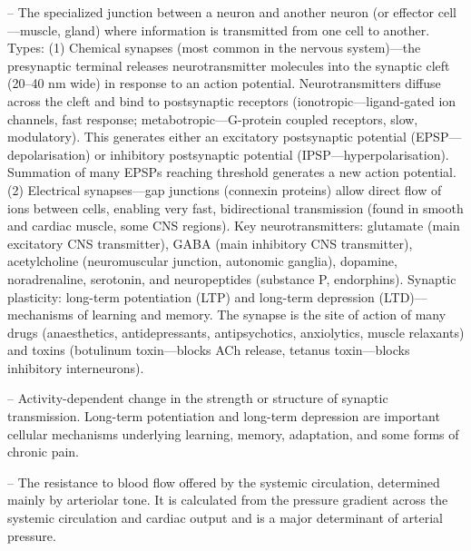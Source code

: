 -- The specialized junction between a neuron and another neuron (or effector cell—muscle, gland) where information is transmitted from one cell to another. Types: (1) Chemical synapses (most common in the nervous system)—the presynaptic terminal releases neurotransmitter molecules into the synaptic cleft (20--40 nm wide) in response to an action potential. Neurotransmitters diffuse across the cleft and bind to postsynaptic receptors (ionotropic—ligand-gated ion channels, fast response; metabotropic—G-protein coupled receptors, slow, modulatory). This generates either an excitatory postsynaptic potential (EPSP—depolarisation) or inhibitory postsynaptic potential (IPSP—hyperpolarisation). Summation of many EPSPs reaching threshold generates a new action potential. (2) Electrical synapses—gap junctions (connexin proteins) allow direct flow of ions between cells, enabling very fast, bidirectional transmission (found in smooth and cardiac muscle, some CNS regions). Key neurotransmitters: glutamate (main excitatory CNS transmitter), GABA (main inhibitory CNS transmitter), acetylcholine (neuromuscular junction, autonomic ganglia), dopamine, noradrenaline, serotonin, and neuropeptides (substance P, endorphins). Synaptic plasticity: long-term potentiation (LTP) and long-term depression (LTD)—mechanisms of learning and memory. The synapse is the site of action of many drugs (anaesthetics, antidepressants, antipsychotics, anxiolytics, muscle relaxants) and toxins (botulinum toxin—blocks ACh release, tetanus toxin—blocks inhibitory interneurons).

-- Activity-dependent change in the strength or structure of synaptic transmission. Long-term potentiation and long-term depression are important cellular mechanisms underlying learning, memory, adaptation, and some forms of chronic pain.

-- The resistance to blood flow offered by the systemic circulation, determined mainly by arteriolar tone. It is calculated from the pressure gradient across the systemic circulation and cardiac output and is a major determinant of arterial pressure.

